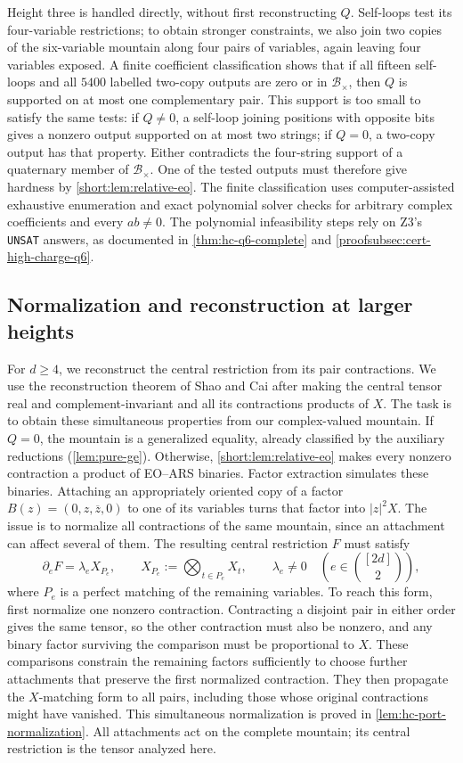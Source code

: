 \documentclass[11pt,letterpaper,onecolumn]{article}
\theoremstyle{plain}
\theoremstyle{definition}
\theoremstyle{remark}
\begin{document}
Height three is handled directly, without first reconstructing \(Q\).
Self-loops test its four-variable restrictions; to obtain stronger
constraints, we also join two copies of the six-variable mountain along
four pairs of variables, again leaving four variables exposed. A finite
coefficient classification shows that if all fifteen self-loops and all
\(5400\) labelled two-copy outputs are zero or in \(\mathcal B_\times\),
then \(Q\) is supported on at most one complementary pair. This support
is too small to satisfy the same tests: if \(Q\ne0\), a self-loop
joining positions with opposite bits gives a nonzero output supported on
at most two strings; if \(Q=0\), a two-copy output has that property.
Either contradicts the four-string support of a quaternary member of
\(\mathcal B_\times\). One of the tested outputs must therefore give
hardness by \cref{short:lem:relative-eo}.
The finite classification uses computer-assisted exhaustive enumeration
and exact polynomial solver checks for arbitrary complex coefficients
and every \(ab\ne0\). The polynomial infeasibility steps rely on Z3's
\texttt{UNSAT} answers, as documented in \cref{thm:hc-q6-complete} and
\cref{proofsubsec:cert-high-charge-q6}.

\subsection{Normalization and reconstruction at larger heights}

For \(d\ge4\), we reconstruct the central restriction from its pair
contractions. We use the reconstruction theorem of Shao and Cai
\cite[full version, Lemma~2.11]{ShaoCai2020} after making the central
tensor real and complement-invariant and all its contractions products
of \(X\). The task is to obtain these simultaneous properties from our
complex-valued mountain. If \(Q=0\), the mountain is a generalized
equality, already classified by the auxiliary reductions (\cref{lem:pure-ge}). Otherwise, \cref{short:lem:relative-eo} makes
every nonzero contraction a product of EO--ARS binaries. Factor
extraction simulates these binaries. Attaching an appropriately oriented
copy of a factor \(B(z)=(0,z,\overline z,0)\) to one of its variables
turns that factor into \(|z|^2X\). The issue is to normalize all
contractions of the same mountain, since an attachment can affect
several of them. The resulting central restriction \(F\) must satisfy
\[
\partial_eF=\lambda_e X_{P_e},\qquad
X_{P_e}:=\bigotimes_{t\in P_e}X_t,\qquad \lambda_e\ne0
\quad\left(e\in\binom{[2d]}2\right),
\]
where \(P_e\) is a perfect matching of the remaining variables. To reach
this form, first normalize one nonzero contraction. Contracting a
disjoint pair in either order gives the same tensor, so the other
contraction must also be nonzero, and any binary factor surviving the
comparison must be proportional to \(X\). These comparisons constrain
the remaining factors sufficiently to choose further attachments that
preserve the first normalized contraction. They then propagate the
\(X\)-matching form to all pairs, including those whose original
contractions might have vanished. This simultaneous normalization is
proved in \cref{lem:hc-port-normalization}. All
attachments act on the complete mountain; its central restriction is
the tensor analyzed here.
\end{document}

